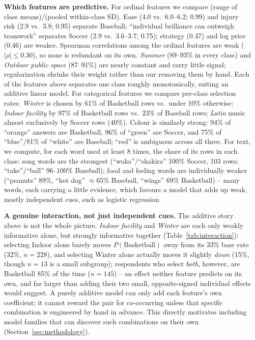 \documentclass[12pt]{article}
\begin{document}
\textbf{Which features are predictive.} For ordinal features we compare (range of class
means)/(pooled within-class SD). Ease (4.0 vs.\ 6.0--6.2; 0.99) and injury risk (2.9 vs.\ 3.8; 0.95)
separate Baseball; ``individual brilliance can outweigh teamwork'' separates Soccer (2.9 vs.\
3.6--3.7; 0.75); strategy (0.47) and log price (0.46) are weaker. Spearman correlations among the
ordinal features are weak ($|\rho|\leq0.30$), so none is redundant on its own. \emph{Summer}
(89--93\% in every class) and \emph{Outdoor public space} (87--91\%) are nearly constant and carry
little signal; regularization shrinks their weight rather than our removing them by hand. Each of
the features above separates one class roughly monotonically, suiting an additive linear model.
For categorical features we compare per-class selection rates: \emph{Winter} is chosen by 61\% of
Basketball rows vs.\ under 10\% otherwise; \emph{Indoor facility} by 97\% of Basketball rows vs.\
23\% of Baseball rows; \emph{Latin} music almost exclusively by Soccer rows (40\%). Colour is
similarly strong: 94\% of ``orange'' answers are Basketball, 96\% of ``green'' are Soccer, and
75\% of ``blue''/81\% of ``white'' are Baseball; ``red'' is ambiguous across all three. For text,
we compute, for each word used at least 8 times, the share of its rows in each class: song words
are the strongest (``waka''/``shakira'' 100\% Soccer, 103 rows; ``take''/``ball'' 96--100\%
Baseball); food and feeling words are individually weaker (``peanuts'' 89\%, ``hot dog''
$\approx$65\% Baseball, ``wings'' 69\% Basketball) -- many words, each carrying a little evidence,
which favours a model that adds up weak, mostly independent cues, such as logistic regression.

\textbf{A genuine interaction, not just independent cues.} The additive story above is not the
whole picture. \emph{Indoor facility} and \emph{Winter} are each only weakly informative alone, but
strongly informative together (Table~\ref{tab:interaction}): selecting Indoor alone barely moves
$P(\text{Basketball})$ away from its 33\% base rate (32\%, $n=228$), and selecting Winter alone
actually moves it slightly \emph{down} (15\%, though $n=13$ is a small subgroup); respondents who
select \emph{both}, however, are Basketball 85\% of the time ($n=145$) -- an effect neither feature
predicts on its own, and far larger than adding their two small, opposite-signed individual effects
would suggest. A purely additive model can only add each feature's own coefficient; it cannot
reward the pair for co-occurring unless that specific combination is engineered by hand in advance.
This directly motivates including model families that can discover such combinations on their own
(Section~\ref{sec:methodology}).
\end{document}
